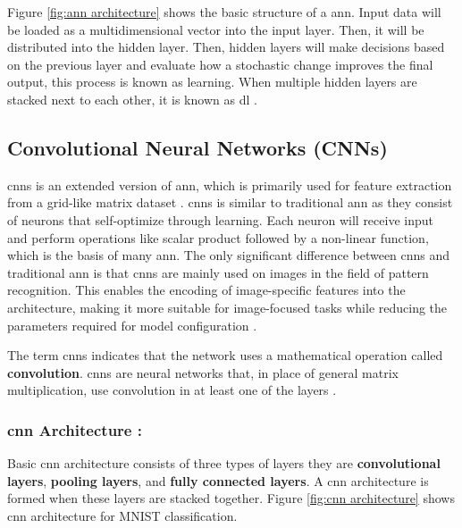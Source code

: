 Figure \ref{fig:ann architecture} shows the basic structure of a \gls{ann}. Input data will be loaded as a multidimensional vector into the input layer. Then, it will be distributed into the hidden layer. Then, hidden layers will make decisions based on the previous layer and evaluate how a stochastic change improves the final output, this process is known as learning. When multiple hidden layers are stacked next to each other, it is known as \gls{dl} \cite{oshea2015introductionconvolutionalneuralnetworks}.

\subsection{Convolutional Neural Networks (CNNs)}

\glspl{cnn}\cite{726791} is an extended version of \gls{ann}, which is primarily used for feature extraction from a grid-like matrix dataset \cite{GeeksforGeeks2024}. \glspl{cnn} is similar to traditional \gls{ann} as they consist of neurons that self-optimize through learning. Each neuron will receive input and perform operations like scalar product followed by a non-linear function, which is the basis of many \gls{ann}. The only significant difference between \glspl{cnn} and traditional \gls{ann} is that \glspl{cnn} are mainly used on images in the field of pattern recognition. This enables the encoding of image-specific features into the architecture, making it more suitable for image-focused tasks while reducing the parameters required for model configuration \cite{oshea2015introductionconvolutionalneuralnetworks}.

The term \glspl{cnn} indicates that the network uses a mathematical operation called \textbf{convolution}. \glspl{cnn} are neural networks that, in place of general matrix multiplication, use convolution in at least one of the layers \cite{Goodfellow-et-al-2016}.

\subsubsection*{\gls{cnn} Architecture :}

Basic \gls{cnn} architecture consists of three types of layers they are \textbf{convolutional layers}, \textbf{pooling layers}, and \textbf{fully connected layers}. A \gls{cnn} architecture is formed when these layers are stacked together. Figure \ref{fig:cnn architecture} shows \gls{cnn} architecture for MNIST\cite{6296535} classification.


